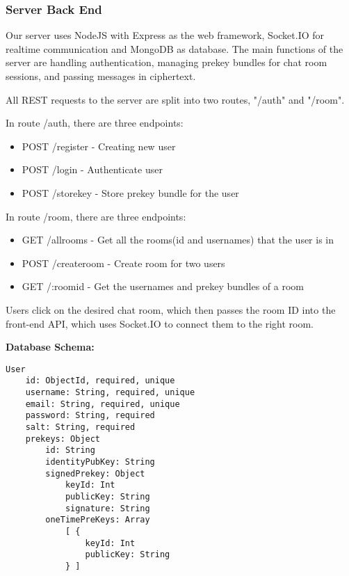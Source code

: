 \documentclass[12pt]{article}
\begin{document}
\subsubsection{Server Back End}
Our server uses NodeJS with Express as the web framework, Socket.IO for realtime communication and MongoDB as database. The main functions of the server are handling authentication, managing prekey bundles for chat room sessions, and passing messages in ciphertext. 

\par All REST requests to the server are split into two routes, "/auth" and "/room".

\par In route /auth, there are three endpoints:
    \begin{itemize}
        \item POST /register - Creating new user
        \item POST /login - Authenticate user
        \item POST /storekey - Store prekey bundle for the user
    \end{itemize}
    

\par In route /room, there are three endpoints:
    \begin{itemize}
        \item GET /allrooms - Get all the rooms(id and usernames) that the user is in
        \item POST /createroom - Create room for two users
        \item GET  /:roomid - Get the usernames and prekey bundles of a room
    \end{itemize}
    
\par Users click on the desired chat room, which then passes the room ID into the front-end API, which uses Socket.IO to connect them to the right room.

\par \textbf{Database Schema:}
\begin{verbatim}
User
    id: ObjectId, required, unique
    username: String, required, unique
    email: String, required, unique
    password: String, required
    salt: String, required
    prekeys: Object
        id: String
        identityPubKey: String
        signedPrekey: Object
            keyId: Int
            publicKey: String
            signature: String
        oneTimePreKeys: Array
            [ { 
                keyId: Int
                publicKey: String
            } ]
\end{verbatim}
\end{document}
